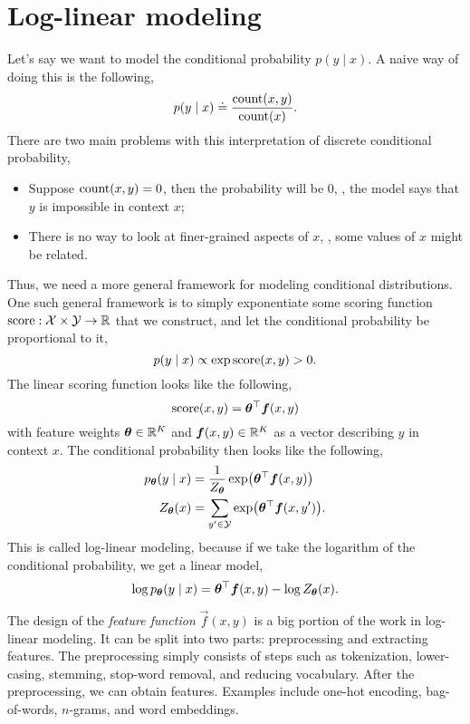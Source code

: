 \section{Log-linear modeling} \label{sec:log-linear-modeling}

Let's say we want to model the conditional probability $p(y\mid x)$. A naive
way of doing this is the following, \[
    p(y\mid x) \doteq \frac{\mathrm{count}(x,y)}{\mathrm{count}(x)}.
\]
There are two main problems with this interpretation of discrete conditional
probability,
\begin{itemize}
    \item Suppose $\mathrm{count}(x,y)=0$, then the probability will be $0$, \ie,
          the model says that $y$ is impossible in context $x$;
    \item There is no way to look at finer-grained aspects of $x$, \ie, some
          values of $x$ might be related.
\end{itemize}

Thus, we need a more general framework for modeling conditional distributions.
One such general framework is to simply exponentiate some scoring function
$\mathrm{score}: \mathcal{X} \times \mathcal{Y} \to \mathbb{R}$ that we construct, and let the conditional
probability be proportional to it, \[
    p(y\mid x) \propto \exp \mathrm{score}(x, y) > 0.
\]
The linear scoring function looks like the following, \[
    \mathrm{score}(x,y) = \bm{\theta}^\top \bm{f}(x, y)
\]
with feature weights $\bm{\theta}\in\mathbb{R}^K$ and $\bm{f}(x,y)\in\mathbb{R}^K$ as a
vector describing $y$ in context $x$. The conditional probability then looks
like the following,
\begin{align*}
    p_{\vec{\theta}}(y\mid x) & = \frac{1}{Z_{\vec{\theta}}} \exp \lft( \transpose{\vec{\theta}} \vec{f}(x,y) \rgt) \\
    Z_{\vec{\theta}}(x)       & = \sum_{y'\in\mathcal{Y}} \exp \lft( \transpose{\vec{\theta}} \vec{f}(x,y') \rgt).
\end{align*}
This is called log-linear modeling, because if we take the logarithm of the
conditional probability, we get a linear model, \[
    \log p_{\bm{\theta}}(y \mid x) = \bm{\theta}^\top \bm{f}(x,y) - \log Z_{\bm{\theta}}(x).
\]

The design of the \textit{feature function} $\vec{f}(x,y)$ is a big portion of
the work in log-linear modeling. It can be split into two parts: preprocessing
and extracting features. The preprocessing simply consists of steps such as tokenization,
lower-casing, stemming, stop-word removal, and reducing vocabulary. After the
preprocessing, we can obtain features. Examples include one-hot encoding,
bag-of-words, $n$-grams, and word embeddings.

